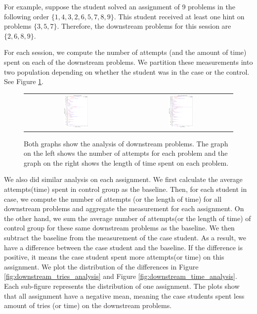 \documentclass{sigchi/sigchi}
\begin{document}
For example, suppose the student solved an assignment of 9 problems in the
following order $\{ 1, 4, 3, 2, 6, 5, 7, 8, 9\}$. This student
received at least one hint on problems $\{3, 5, 7\}$. Therefore, the
downstream problems for this session are $\{2, 6, 8, 9\}$.

For each session, we compute the number of attempts (and the amount of
time) spent on each of the downstream problems. We partition these
measurements into two population depending on whether the student was
in the case or the control. See Figure \ref{fig:prob_analysis}.

\begin{figure}[ht]
  \centering
   \begin{tabular}{c c}
		\includegraphics[width=0.25\textwidth]{image/problem_tries_downstream.png} &
		\includegraphics[width=0.25\textwidth]{image/problem_time_downstream.png}
	\end{tabular}
   \caption{Both graphs show the analysis of downstream problems. The graph on the left shows the number of attempts for each problem and the graph on the right shows the length of time spent on each problem.}
   \label{fig:prob_analysis}
\end{figure}

We also did similar analysis on each assignment. We first calculate the average attempts(time) spent in control group as the baseline. Then, for each student in case, we compute the number of attempts (or the length of time) for all downstream problems and aggregate the measurement for each assignment. On the other hand, we sum the average number of attempts(or the length of time) of control group for these same downstream problems as the baseline. We then subtract the baseline from the measurement of the case student. As a result, we have a difference between the case student and the baseline. If the difference is positive, it means the case student spent more attempts(or time) on this assignment. We plot the distribution of the differences in Figure \ref{fig:downstream_tries_analysis} and Figure \ref{fig:downstream_time_analysis}. Each sub-figure represents the distribution of one assignment. The plots show that all assignment have a negative mean, meaning the case students spent less amount of tries (or time) on the downstream problems.
\end{document}
